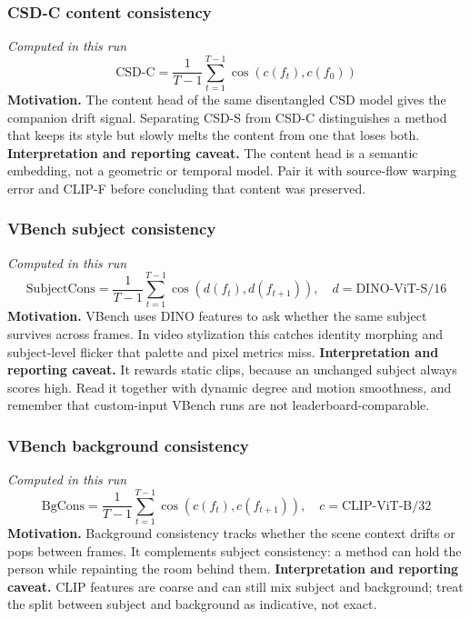 \documentclass[10pt]{article}
\begin{document}
\subsubsection*{CSD-C content consistency}
\textit{Computed in this run}
\begin{equation*}
\mathrm{CSD\text{-}C}=\frac{1}{T-1}\sum_{t=1}^{T-1}\cos\!\left(c(f_t),c(f_0)\right)
\end{equation*}
\textbf{Motivation.} The content head of the same disentangled CSD model gives the companion drift signal. Separating CSD-S from CSD-C distinguishes a method that keeps its style but slowly melts the content from one that loses both.
\textbf{Interpretation and reporting caveat.} The content head is a semantic embedding, not a geometric or temporal model. Pair it with source-flow warping error and CLIP-F before concluding that content was preserved.
\subsubsection*{VBench subject consistency}
\textit{Computed in this run}
\begin{equation*}
\mathrm{SubjectCons}=\frac{1}{T-1}\sum_{t=1}^{T-1}\cos\!\left(d(f_t),d(f_{t+1})\right),\quad d=\mathrm{DINO\text{-}ViT\text{-}S/16}
\end{equation*}
\textbf{Motivation.} VBench uses DINO features to ask whether the same subject survives across frames. In video stylization this catches identity morphing and subject-level flicker that palette and pixel metrics miss.
\textbf{Interpretation and reporting caveat.} It rewards static clips, because an unchanged subject always scores high. Read it together with dynamic degree and motion smoothness, and remember that custom-input VBench runs are not leaderboard-comparable.
\subsubsection*{VBench background consistency}
\textit{Computed in this run}
\begin{equation*}
\mathrm{BgCons}=\frac{1}{T-1}\sum_{t=1}^{T-1}\cos\!\left(c(f_t),c(f_{t+1})\right),\quad c=\mathrm{CLIP\text{-}ViT\text{-}B/32}
\end{equation*}
\textbf{Motivation.} Background consistency tracks whether the scene context drifts or pops between frames. It complements subject consistency: a method can hold the person while repainting the room behind them.
\textbf{Interpretation and reporting caveat.} CLIP features are coarse and can still mix subject and background; treat the split between subject and background as indicative, not exact.
\end{document}
